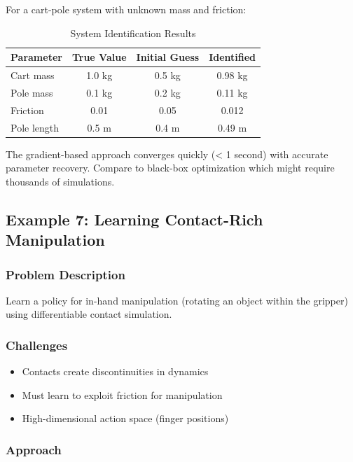For a cart-pole system with unknown mass and friction:

\begin{table}[htbp]
\centering
\caption{System Identification Results}
\label{tab:sysid_results}
\begin{tabular}{lccc}
\toprule
\textbf{Parameter} & \textbf{True Value} & \textbf{Initial Guess} & \textbf{Identified} \\
\midrule
Cart mass & 1.0 kg & 0.5 kg & 0.98 kg \\
Pole mass & 0.1 kg & 0.2 kg & 0.11 kg \\
Friction & 0.01 & 0.05 & 0.012 \\
Pole length & 0.5 m & 0.4 m & 0.49 m \\
\bottomrule
\end{tabular}
\end{table}

The gradient-based approach converges quickly (< 1 second) with accurate parameter recovery. Compare to black-box optimization which might require thousands of simulations.

\subsection{Example 7: Learning Contact-Rich Manipulation}

\subsubsection{Problem Description}

Learn a policy for in-hand manipulation (rotating an object within the gripper) using differentiable contact simulation.

\subsubsection{Challenges}

\begin{itemize}
    \item Contacts create discontinuities in dynamics
    \item Must learn to exploit friction for manipulation
    \item High-dimensional action space (finger positions)
\end{itemize}

\subsubsection{Approach}

